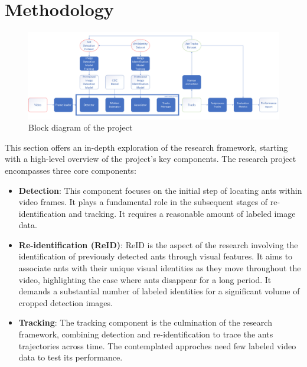 \section{Methodology}

\begin{figure}[t]
    \centering
    \includegraphics[width=\linewidth]{figures/03_introduction/BlockDiagram.png}
    \caption[Project's Block diagram]{\footnotesize{Block diagram of the project}}
    \label{fig:block_diagram}
\end{figure}

{
    This section offers an in-depth exploration of the research framework, 
    starting with a high-level overview of the project's key components. 
    The research project encompasses three core components:
}

\begin{itemize}
    \item {
        \textbf{Detection}: 
        This component focuses on the initial step of locating ants within video frames. 
        It plays a fundamental role in the subsequent stages of re-identification and tracking. 
        It requires a reasonable amount of labeled image data.
    }
    \item {
        \textbf{Re-identification (ReID)}: 
        ReID is the aspect of the research involving the identification of previously detected ants through visual features. 
        It aims to associate ants with their unique visual identities as they move throughout the video, 
        highlighting the case where ants disappear for a long period. 
        It demands a substantial number of labeled identities for a significant volume of cropped detection images.
    }
    \item {
        \textbf{Tracking}:
        The tracking component is the culmination of the research framework, 
        combining detection and re-identification to trace the ants trajectories across time. 
        The contemplated approches need few labeled video data to test its performance.
    }
\end{itemize}

